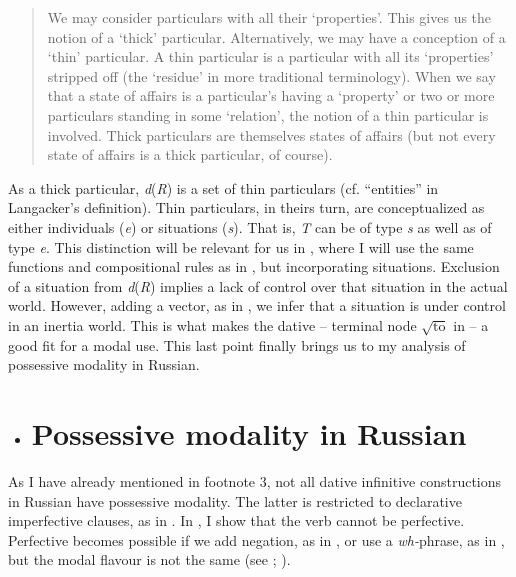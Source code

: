 \documentclass[output=paper,modfonts,nonflat]{langsci/langscibook}
\begin{document}
\begin{quote}
We may consider particulars with all their ‘properties’. This gives us the notion of a ‘thick’ particular. Alternatively, we may have a conception of a ‘thin’ particular. A thin particular is a particular with all its ‘properties’ stripped off (the ‘residue’ in more traditional terminology). When we say that a state of affairs is a particular’s having a ‘property’ or two or more particulars standing in some ‘relation’, the notion of a thin particular is involved. Thick particulars are themselves states of affairs (but not every state of affairs is a thick particular, of course). \citep[613]{Kratzer1989} 
\end{quote}

As a thick particular, \textit{d}(\textit{R}) is a set of thin particulars (cf. “entities” in Langacker’s definition). Thin particulars, in theirs turn, are conceptualized as either individuals (\textit{e}) or situations (\textit{s}). That is, \textit{T} can be of type \textit{s} as well as of type \textit{e}. This distinction will be relevant for us in , where I will use the same functions and compositional rules as in , but incorporating situations. Exclusion of a situation from \textit{d}(\textit{R}) implies a lack of control over that situation in the actual world. However, adding a vector, as in , we infer that a situation is under control in an inertia world. This is what makes the dative – terminal node  $\sqrt{\text{to}}$  in  – a good fit for a modal use. This last point finally brings us to my analysis of possessive modality in Russian.

\begin{itemize}
\item \section{Possessive modality in Russian}
\end{itemize}

As I have already mentioned in footnote 3, not all dative infinitive constructions in Russian have possessive modality. The latter is restricted to declarative imperfective clauses, as in . In , I show that the verb cannot be perfective. Perfective becomes possible if we add negation, as in , or use a \textit{wh-}phrase, as in , but the modal flavour is not the same (see \citealt{Fortuin2007}; \citealt{Tsedryk2018}).
\end{document}
